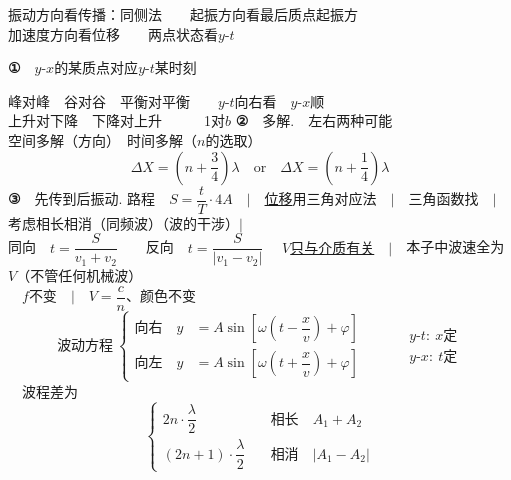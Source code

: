 \hspace*{1em}振动方向看传播：同侧法　　起振方向看最后质点起振方\\
\hspace*{1em}加速度方向看位移　　两点状态看$y$-$t$

\medskip
\textbf{①}　$y$-$x$的某质点对应$y$-$t$某时刻

峰对峰　谷对谷　平衡对平衡　　$y$-$t$向右看　$y$-$x$顺\\
上升对下降　下降对上升　　　1对$b$
\textbf{②}　多解.　左右两种可能\\
空间多解（方向）　时间多解（$n$的选取）
\[
\Delta X=\left(n+\dfrac{3}{4}\right)\lambda\quad\text{or}\quad \Delta X=\left(n+\dfrac{1}{4}\right)\lambda
\]
\textbf{③}　先传到后振动.
路程　$S=\dfrac{t}{T}\cdot 4A$　$\big|$　\underline{位移}用三角对应法　$\big|$　三角函数找　$\big|$　考虑相长相消（同频波）（波的干涉）$\big|$\\[0.8ex]
同向　$t=\dfrac{S}{v_1+v_2}$　　反向　$t=\dfrac{S}{|v_1-v_2|}$ %
　\underline{$V$只与介质有关}　$\big|$　本子中波速全为$V$（不管任何机械波）\\[1ex]
　$f$不变　$\big|$　$V=\dfrac{c}{n}$、颜色不变
\[
\text{波动方程}\ \left\{\begin{aligned}
\text{向右}\quad y&=A\sin\left[\omega\left(t-\dfrac{x}{v}\right)+\varphi\right]\\
\text{向左}\quad y&=A\sin\left[\omega\left(t+\dfrac{x}{v}\right)+\varphi\right]
\end{aligned}\right.
\qquad
\begin{aligned}
&y\text{-}t:\ x\text{定}\\
&y\text{-}x:\ t\text{定}
\end{aligned}
\]
　波程差为
\[
\left\{\begin{aligned}
2n\cdot\dfrac{\lambda}{2}&\quad\text{相长}\quad A_1+A_2\\
(2n+1)\cdot\dfrac{\lambda}{2}&\quad\text{相消}\quad |A_1-A_2|
\end{aligned}\right.
\]

